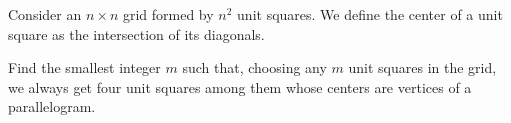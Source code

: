 \documentclass[varwidth]{standalone}
\begin{document}
    Consider an $n \times n$ grid formed by $n^2$ unit squares. We define the center of a unit square as the intersection of its diagonals.

    Find the smallest integer $m$ such that, choosing any $m$ unit squares in the grid, we always get four unit squares among them whose centers are vertices of a parallelogram.
\end{document}
